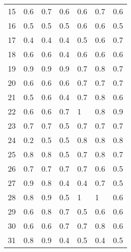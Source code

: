 \begin{table}[]
\begin{tabular}{l|lll|lll}
15              & 0.6                  & 0.7       & 0.6     & 0.6     & 0.7 & 0.6     \\
16              & 0.5                  & 0.5       & 0.5     & 0.6     & 0.6 & 0.5     \\
17              & 0.4                  & 0.4       & 0.4     & 0.5     & 0.6 & 0.7     \\
18              & 0.6                  & 0.6       & 0.4     & 0.6     & 0.6 & 0.6     \\
19              & 0.9                  & 0.9       & 0.9     & 0.7     & 0.8 & 0.7     \\
20              & 0.6                  & 0.6       & 0.6     & 0.7     & 0.7 & 0.7     \\
21              & 0.5                  & 0.6       & 0.4     & 0.7     & 0.8 & 0.6     \\
22              & 0.6                  & 0.6       & 0.7     & 1       & 0.8 & 0.9     \\
23              & 0.7                  & 0.7       & 0.5     & 0.7     & 0.7 & 0.7     \\
24              & 0.2                  & 0.5       & 0.5     & 0.8     & 0.8 & 0.8     \\
25              & 0.8                  & 0.8       & 0.5     & 0.7     & 0.8 & 0.7     \\
26              & 0.7                  & 0.7       & 0.7     & 0.7     & 0.6 & 0.5     \\
27              & 0.9                  & 0.8       & 0.4     & 0.4     & 0.7 & 0.5     \\
28              & 0.8                  & 0.9       & 0.5     & 1       & 1   & 0.6     \\
29              & 0.6                  & 0.8       & 0.7     & 0.5     & 0.6 & 0.6     \\
30              & 0.6                  & 0.6       & 0.7     & 0.7     & 0.8 & 0.6     \\
31              & 0.8                  & 0.9       & 0.4     & 0.5     & 0.4 & 0.5     \\
\end{tabular}
\end{table}
\clearpage
